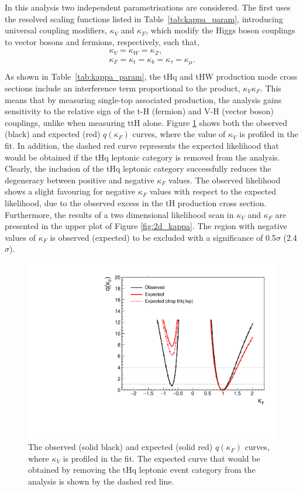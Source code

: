 In this analysis two independent parametrisations are considered. The first uses the resolved scaling functions listed in Table~\ref{tab:kappa_param}, introducing universal coupling modifiers, $\kappa_V$ and $\kappa_F$, which modify the Higgs boson couplings to vector bosons and fermions, respectively, such that,
\begin{equation}
    \begin{split}
        \kappa_V = \kappa_W = \kappa_Z, \\
        \kappa_F = \kappa_t = \kappa_b = \kappa_\tau = \kappa_\mu. \\
    \end{split}
\end{equation}
\noindent
As shown in Table~\ref{tab:kappa_param}, the tHq and tHW production mode cross sections include an interference term proportional to the product, $\kappa_V\kappa_F$. This means that by measuring single-top associated production, the analysis gains sensitivity to the relative sign of the t-H (fermion) and V-H (vector boson) couplings, unlike when measuring ttH alone. Figure \ref{fig:kappa_F} shows both the observed (black) and expected (red) $q(\kappa_F)$ curves, where the value of $\kappa_V$ is profiled in the fit. In addition, the dashed red curve represents the expected likelihood that would be obtained if the tHq leptonic category is removed from the analysis. Clearly, the inclusion of the tHq leptonic category successfully reduces the degeneracy between positive and negative $\kappa_F$ values. The observed likelihood shows a slight favouring for negative $\kappa_F$ values with respect to the expected likelihood, due to the observed excess in the tH production cross section. Furthermore, the results of a two dimensional likelihood scan in $\kappa_V$ and $\kappa_F$ are presented in the upper plot of Figure \ref{fig:2d_kappa}. The region with negative values of $\kappa_F$ is observed (expected) to be excluded with a significance of 0.5$\sigma$ (2.4$\sigma$).

\begin{figure}[htb!]
  \centering
  \includegraphics[width=.6\textwidth]{Figures/hgg_results/profile1D_kappa_F.pdf}
  \caption[Observed and expected likelihood curves for $\kappa_F$]
  {
    The observed (solid black) and expected (solid red) $q(\kappa_F)$ curves, where $\kappa_V$ is profiled in the fit. The expected curve that would be obtained by removing the tHq leptonic event category from the analysis is shown by the dashed red line.
  }
  \label{fig:kappa_F}
\end{figure}

